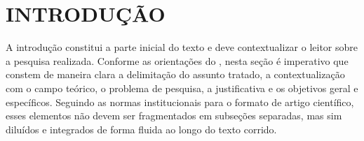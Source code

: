 





\frenchspacing




\section{INTRODUÇÃO}
\label{sec:introducao}

A introdução constitui a parte inicial do texto e deve contextualizar o leitor sobre a pesquisa realizada. Conforme as orientações do , nesta seção é imperativo que constem de maneira clara a delimitação do assunto tratado, a contextualização com o campo teórico, o problema de pesquisa, a justificativa e os objetivos geral e específicos. Seguindo as normas institucionais para o formato de artigo científico, esses elementos não devem ser fragmentados em subseções separadas, mas sim diluídos e integrados de forma fluida ao longo do texto corrido.

